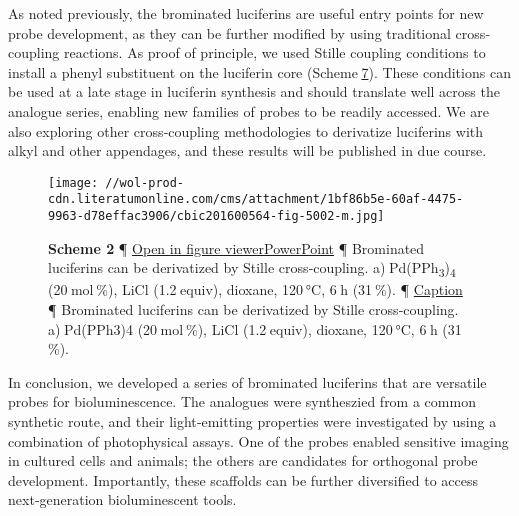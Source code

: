 As noted previously, the brominated luciferins are useful entry points
for new probe development, as they can be further modified by using
traditional cross‐coupling reactions. As proof of principle, we used
Stille coupling conditions to install a phenyl substituent on the
luciferin core (Scheme \protect\hyperlink{cbic201600564-fig-5002}{7}).
These conditions can be used at a late stage in luciferin synthesis and
should translate well across the analogue series, enabling new families
of probes to be readily accessed. We are also exploring other
cross‐coupling methodologies to derivatize luciferins with alkyl and
other appendages, and these results will be published in due course.

\begin{figure}
\centering
\texttt{[image: //wol-prod-cdn.literatumonline.com/cms/attachment/1bf86b5e-60af-4475-9963-d78effac3906/cbic201600564-fig-5002-m.jpg]}
\caption{\textbf{Scheme 2} ¶ \protect\hyperlink{}{Open in figure
viewer}\href{/action/downloadFigures?id=cbic201600564-fig-5002\&doi=10.1002\%2Fcbic.201600564}{PowerPoint}
¶ Brominated luciferins can be derivatized by Stille cross‐coupling.
a) Pd(PPh\textsubscript{3})\textsubscript{4} (20 mol \%), LiCl
(1.2 equiv), dioxane, 120 °C, 6 h (31 \%). ¶
\protect\hyperlink{}{{Caption}\emph{}} ¶ Brominated luciferins can be
derivatized by Stille cross‐coupling. a) Pd(PPh3)4 (20 mol \%), LiCl
(1.2 equiv), dioxane, 120 °C, 6 h (31 \%).}
\end{figure}

In conclusion, we developed a series of brominated luciferins that are
versatile probes for bioluminescence. The analogues were syntheszied
from a common synthetic route, and their light‐emitting properties were
investigated by using a combination of photophysical assays. One of the
probes enabled sensitive imaging in cultured cells and animals; the
others are candidates for orthogonal probe development. Importantly,
these scaffolds can be further diversified to access next‐generation
bioluminescent tools.




